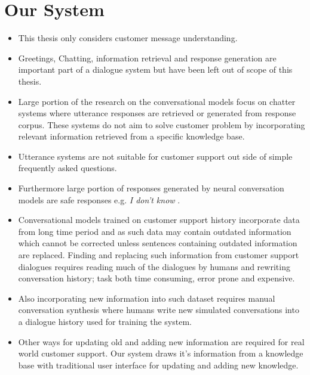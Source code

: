 \documentclass[12pt,a4paper,english
]{tutthesis}
\begin{document}
\chapter{Our System}
\label{ch:our_system}
\begin{itemize}
\item This thesis only considers customer message understanding.
\item Greetings, Chatting, information retrieval and response generation are important part of a dialogue system but have been left out of scope of this thesis.
\item Large portion of the research on the conversational models focus on chatter systems where utterance responses are retrieved or generated from response corpus. These systems do not aim to solve customer problem by incorporating relevant information retrieved from a specific knowledge base.
\item Utterance systems are not suitable for customer support out side of simple frequently asked questions.
\item Furthermore large portion of responses generated by neural conversation models are safe responses e.g. \textit{I don't know} \cite{Li2015}.
\item Conversational models trained on customer support history incorporate data from long time period and as such data may contain outdated information which cannot be corrected unless sentences containing outdated information are replaced. Finding and replacing such information from customer support dialogues requires reading much of the dialogues by humans and rewriting conversation history; task both time consuming, error prone and expensive.
\item Also incorporating new information into such dataset requires manual conversation synthesis where humans write new simulated conversations into a dialogue history used for training the system.
\item Other ways for updating old and adding new information are required for real world customer support. Our system draws it's information from a knowledge base with traditional user interface for updating and adding new knowledge.
\end{itemize}
\end{document}

